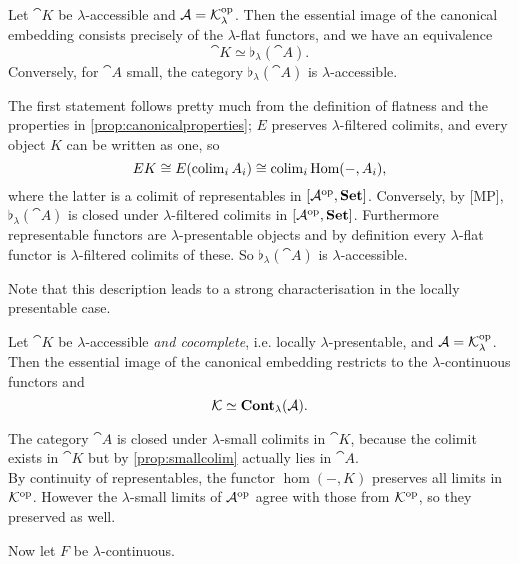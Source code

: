 \begin{Proposition}
Let $\cat K$ be $\lambda$-accessible and $\mathcal{A} = \mathcal{K}^{\textrm{op}}_\lambda$. Then the essential image of the canonical embedding consists precisely of the $\lambda$-flat functors, and we have an equivalence
\[ \cat K \simeq \flat_\lambda(\cat A). \]
Conversely, for $\cat A$ small, the category $\flat_\lambda(\cat A)$ is $\lambda$-accessible.
\end{Proposition}
\begin{Proof}
The first statement follows pretty much from the definition of flatness and the properties in \ref{prop:canonicalproperties}; $E$ preserves $\lambda$-filtered colimits, and every object $K$ can be written as one, so
\[ EK \cong E(\operatorname{colim}_i A_i) \cong \operatorname{colim}_i \textrm{Hom}(-,A_i), \]
where the latter is a colimit of representables in $[\mathcal{A}^{\textrm{op}},\mathbf{Set}]$.
Conversely, by [MP], $\flat_\lambda(\cat A)$ is closed under $\lambda$-filtered colimits in $[\mathcal{A}^{\textrm{op}},\mathbf{Set}]$. Furthermore representable functors are $\lambda$-presentable objects and by definition every $\lambda$-flat functor is $\lambda$-filtered colimits of these. So $\flat_\lambda(\cat A)$ is $\lambda$-accessible. %
\end{Proof}

Note that this description leads to a strong characterisation in the locally presentable case.
\begin{Proposition}
Let $\cat K$ be $\lambda$-accessible \emph{and cocomplete}, i.e. locally $\lambda$-presentable, and $\mathcal{A} = \mathcal{K}^{\textrm{op}}_\lambda$. Then the essential image of the canonical embedding restricts to the $\lambda$-continuous functors and
\[ \mathcal{K} \simeq \mathbf{Cont}_\lambda(\mathcal{A}). \]
\end{Proposition}
\begin{Proof}
The category $\cat A$ is closed under $\lambda$-small colimits in $\cat K$, because the colimit exists in $\cat K$ but by \ref{prop:smallcolim} actually lies in $\cat A$. \\

By continuity of representables, the functor $\hom(-, K)$ preserves all limits in $\mathcal{K}^{\textrm{op}}$. However the $\lambda$-small limits of $\mathcal{A}^{\textrm{op}}$ agree with those from $\mathcal{K}^{\textrm{op}}$, so they preserved as well.

Now let $F$ be $\lambda$-continuous.
\end{Proof}


